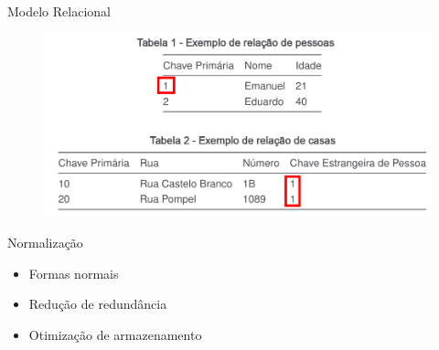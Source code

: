 \documentclass{beamer} %
\begin{document}
    

\begin{frame}{Modelo Relacional}
    \begin{figure}
        \centering
        \includegraphics[width=\linewidth]{imagens/relacional.png}
        \label{fig:banco-de-dados-relacional}
    \end{figure}
\end{frame}

\begin{frame}{Normalização}
    \begin{itemize}
        \item Formas normais
        \item Redução de redundância
        \item Otimização de armazenamento
    \end{itemize}
\end{frame}
\end{document}
